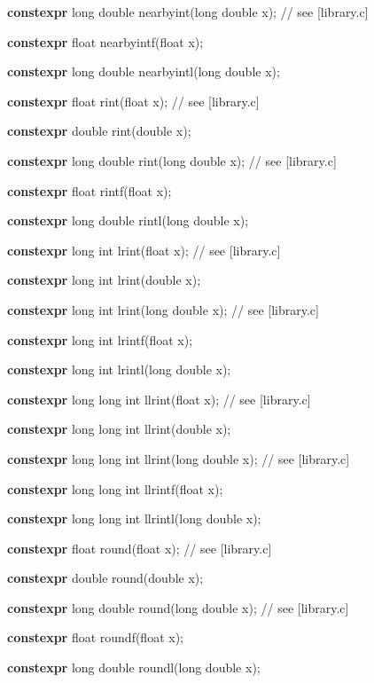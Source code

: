 \documentclass[prd,preprint,amsmath,amssymb,nofootinbib,eqsecnum]{revtex4-1}
\newcommand{\highlight}[1]{{\bf #1}}
\begin{document}
{\highlight{constexpr} long double nearbyint(long double x); // see [library.c]

\highlight{constexpr} float nearbyintf(float x);

\highlight{constexpr} long double nearbyintl(long double x);

\vspace{2ex}

\highlight{constexpr} float rint(float x); // see [library.c]

\highlight{constexpr} double rint(double x);

\highlight{constexpr} long double rint(long double x); // see [library.c]

\highlight{constexpr} float rintf(float x);

\highlight{constexpr} long double rintl(long double x);

\vspace{2ex}

\highlight{constexpr} long int lrint(float x); // see [library.c]

\highlight{constexpr} long int lrint(double x);

\highlight{constexpr} long int lrint(long double x); // see [library.c]

\highlight{constexpr} long int lrintf(float x);

\highlight{constexpr} long int lrintl(long double x);

\vspace{2ex}

\highlight{constexpr} long long int llrint(float x); // see [library.c]

\highlight{constexpr} long long int llrint(double x);

\highlight{constexpr} long long int llrint(long double x); // see [library.c]

\highlight{constexpr} long long int llrintf(float x);

\highlight{constexpr} long long int llrintl(long double x);

\vspace{2ex}

\highlight{constexpr} float round(float x); // see [library.c]

\highlight{constexpr} double round(double x);

\highlight{constexpr} long double round(long double x); // see [library.c]

\highlight{constexpr} float roundf(float x);

\highlight{constexpr} long double roundl(long double x);

}
\end{document}

